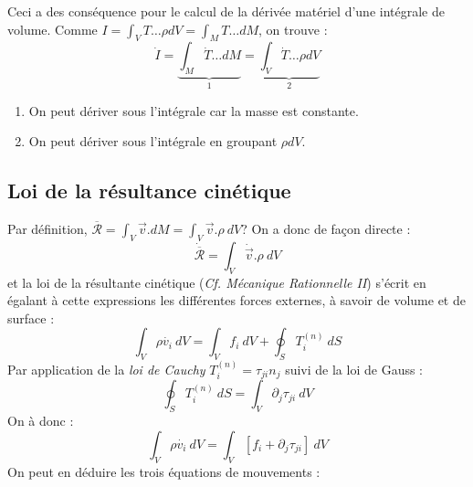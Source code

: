     Ceci a des conséquence pour le calcul de la dérivée matériel d'une intégrale de volume. Comme $I = \int_V
    T\dots \rho dV = \int_M T\dots dM$, on trouve :
    \begin{equation}
    \dot{I} = \underbrace{\int_M \dot{T}\dots dM}_{1} = \underbrace{\int_V \dot{T}\dots\rho dV}_{2}
    \end{equation}
    \begin{enumerate}
    \item On peut dériver sous l'intégrale car la masse est constante.
    \item On peut dériver sous l'intégrale en groupant $\rho dV$.
    \end{enumerate}
    
    \subsection{Loi de la résultance cinétique}
    Par définition, $\overline{\mathcal{R}} = \int_V \vec{v}.dM = \int_V \vec{v}.\rho\ dV$? On a donc de 
    façon directe :
    \begin{equation}
    \dot{\overline{\mathcal{R}}} = \int_V \dot{\vec{v}}.\rho\ dV
    \end{equation}
    et la loi de la résultante cinétique (\textit{Cf. Mécanique Rationnelle II}) s'écrit en égalant à cette
    expressions les différentes forces externes, à savoir de volume et de surface :
    \begin{equation}
    \int_V \rho \dot{v_i}\ dV = \int_V f_i\ dV + \oint_S T_i^{(n)}\ dS
    \end{equation}
    Par application de la \textit{loi de Cauchy} $T_i^{(n)} = \tau_{ji}n_j$ suivi de la loi de Gauss :
    \begin{equation}
    \oint_S T_i^{(n)}\ dS = \int_V \partial_j \tau_{ji}\ dV
    \end{equation}
    On à donc :
    \begin{equation}
    \int_V \rho \dot{v_i}\ dV = \int_V [f_i +\partial_j \tau_{ji}]\ dV
    \end{equation}
    On peut en déduire les trois équations de mouvements : \\
    \ \\
    
